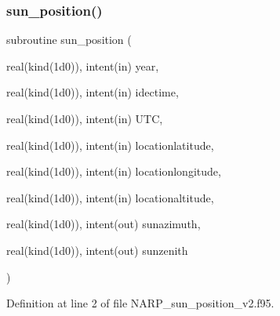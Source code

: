 \subsubsection{\texorpdfstring{sun\+\_\+position()}{sun\_position()}}
{\footnotesize\ttfamily subroutine sun\+\_\+position (\begin{DoxyParamCaption}\item[{real(kind(1d0)), intent(in)}]{year,  }\item[{real(kind(1d0)), intent(in)}]{idectime,  }\item[{real(kind(1d0)), intent(in)}]{U\+TC,  }\item[{real(kind(1d0)), intent(in)}]{locationlatitude,  }\item[{real(kind(1d0)), intent(in)}]{locationlongitude,  }\item[{real(kind(1d0)), intent(in)}]{locationaltitude,  }\item[{real(kind(1d0)), intent(out)}]{sunazimuth,  }\item[{real(kind(1d0)), intent(out)}]{sunzenith }\end{DoxyParamCaption})}



Definition at line 2 of file N\+A\+R\+P\+\_\+sun\+\_\+position\+\_\+v2.\+f95.

